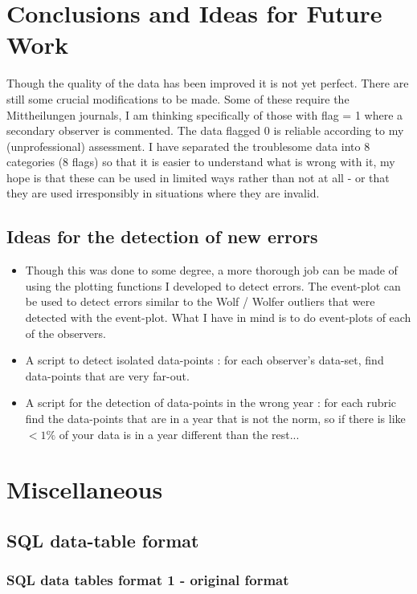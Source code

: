 \documentclass[12pt]{article}
\begin{document}
\section{Conclusions and Ideas for Future Work}
Though the quality of the data has been improved it is not yet perfect. There are still some crucial modifications to be made. Some of these require the Mittheilungen journals, I am thinking specifically of those with flag = 1 where a secondary observer is commented. The data flagged 0 is reliable according to my (unprofessional) assessment. I have separated the troublesome data into 8 categories (8 flags) so that it is easier to understand what is wrong with it, my hope is that these can be used in limited ways rather than not at all - or that they are used irresponsibly in situations where they are invalid. 

\subsection{Ideas for the detection of new errors}
\begin{itemize}
\item Though this was done to some degree, a more thorough job can be made of using the plotting functions I developed to detect errors. The event-plot can be used to detect errors similar to the Wolf / Wolfer outliers that were detected with the event-plot. What I have in mind is to do event-plots of each of the observers.
\item A script to detect isolated data-points : for each observer's data-set, find data-points that are very far-out. 
\item A script for the detection of data-points in the wrong year : for each rubric find the data-points that are in a year that is not the norm, so if there is like $<1\%$ of your data is in a year different than the rest...
\end{itemize}

\section{Miscellaneous}

\subsection{SQL data-table format}

\subsubsection{SQL data tables format 1 - original format}
\end{document}
